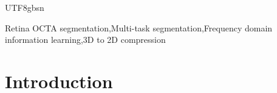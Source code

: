 \documentclass[times, review, 10pt]{elsarticle}
\begin{document}
\begin{CJK}{UTF8}{gbsn}
\begin{frontmatter}

\begin{keyword}
Retina OCTA segmentation\sep Multi-task segmentation\sep Frequency domain information learning\sep 3D to 2D compression
\end{keyword}

\end{frontmatter}


\section{Introduction}\label{Introduction}

\end{CJK}
\end{document}
